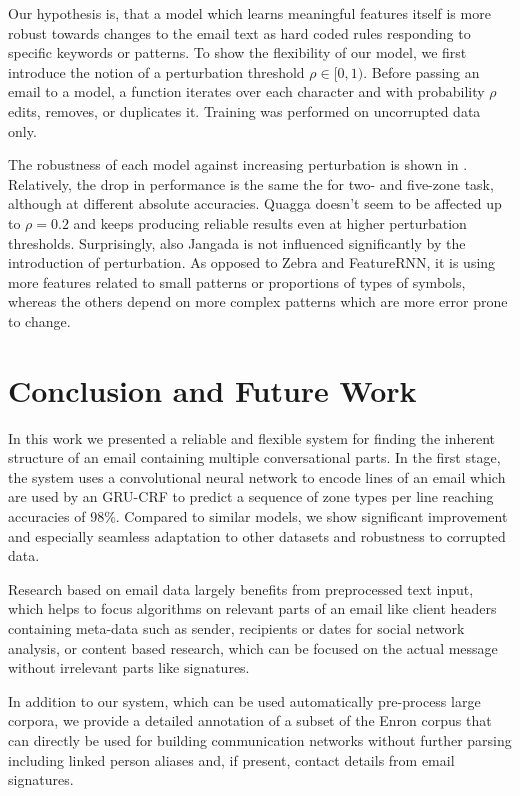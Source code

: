 \documentclass{llncs}
\begin{document}
Our hypothesis is, that a model which learns meaningful features itself is more robust towards changes to the email text as hard coded rules responding to specific keywords or patterns.
To show the flexibility of our model, we first introduce the notion of a perturbation threshold $\rho\in[0,1)$.
Before passing an email to a model, a function iterates over each character and with probability $\rho$ edits, removes, or duplicates it.
Training was performed on uncorrupted data only.

The robustness of each model against increasing perturbation is shown in .
Relatively, the drop in performance is the same the for two- and five-zone task, although at different absolute accuracies.
Quagga doesn't seem to be affected up to $\rho=0.2$ and keeps producing reliable results even at higher perturbation thresholds.
Surprisingly, also Jangada is not influenced significantly by the introduction of perturbation.
As opposed to Zebra and FeatureRNN, it is using more features related to small patterns or proportions of types of symbols, whereas the others depend on more complex patterns which are more error prone to change.

\section{Conclusion and Future Work}
In this work we presented a reliable and flexible system for finding the inherent structure of an email containing multiple conversational parts.
In the first stage, the system uses a convolutional neural network to encode lines of an email which are used by an GRU-CRF to predict a sequence of zone types per line reaching accuracies of 98\%.
Compared to similar models, we show significant improvement and especially seamless adaptation to other datasets and robustness to corrupted data.

Research based on email data largely benefits from preprocessed text input, which helps to focus algorithms on relevant parts of an email like client headers containing meta-data such as sender, recipients or dates for social network analysis, or content based research, which can be focused on the actual message without irrelevant parts like signatures.

In addition to our system, which can be used automatically pre-process large corpora, we provide a detailed annotation of a subset of the Enron corpus that can directly be used for building communication networks without further parsing including linked person aliases and, if present, contact details from email signatures.
\end{document}
